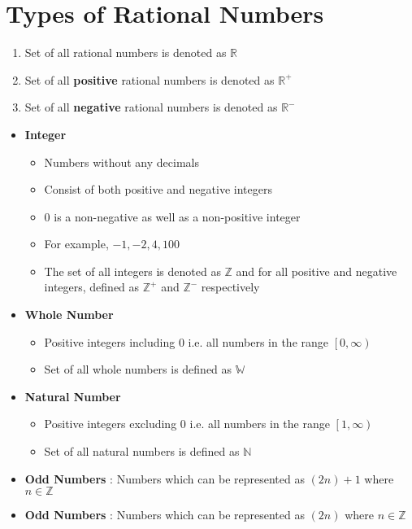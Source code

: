 \section{Types of Rational Numbers}
\begin{NOTE}
    \begin{enumerate}
        \item Set of all rational numbers is denoted as $\mathbb{R}$
        \item Set of all \textbf{positive} rational numbers is denoted as $\mathbb{R}^{+}$
        \item Set of all \textbf{negative} rational numbers is denoted as $\mathbb{R}^{-}$
    \end{enumerate}
\end{NOTE}

\begin{itemize}
    \item \textbf{Integer}
    \begin{itemize}
        \item Numbers without any decimals
        \item Consist of both positive and negative integers
        \item $0$ is a non-negative as well as a non-positive integer
        \item For example, $-1,-2,4,100$
        \item The set of all integers is denoted as $\mathbb{Z}$ and for all positive and negative integers, defined as $\mathbb{Z}^{+}$ and $\mathbb{Z}^{-}$ respectively
    \end{itemize}

    \item \textbf{Whole Number}
    \begin{itemize}
        \item Positive integers including 0 \rm{i.e.} all numbers in the range $\left[ 0, \infty \right)$
        \item Set of all whole numbers is defined as $\mathbb{W}$
    \end{itemize}

    \item \textbf{Natural Number}
    \begin{itemize}
        \item Positive integers excluding 0 \rm{i.e.} all numbers in the range $\left[ 1, \infty \right)$
        \item Set of all natural numbers is defined as $\mathbb{N}$
    \end{itemize}

    \item \textbf{Odd Numbers} : Numbers which can be represented as $(2n) + 1$ where $n \in \mathbb{Z}$

    \item \textbf{Odd Numbers} : Numbers which can be represented as $(2n)$ where $n \in \mathbb{Z}$

\end{itemize}



